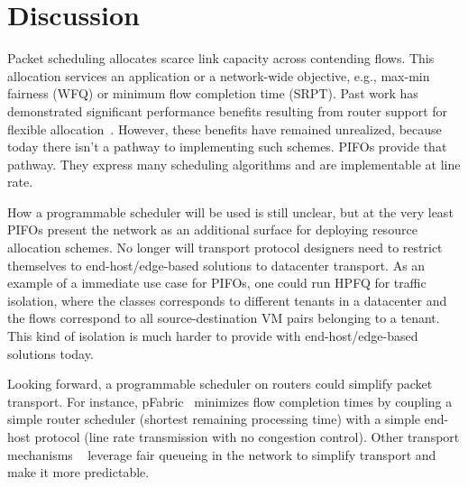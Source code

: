 \pagebreak
\section{Discussion}
\label{s:real_discussion}

Packet scheduling allocates scarce link capacity across contending flows.  This
allocation services an application or a network-wide objective, e.g., max-min
fairness (WFQ) or minimum flow completion time (SRPT).  Past work has
demonstrated significant performance benefits resulting from router support
for flexible allocation~\cite{pFabric, baraat, numfabric, nosilverbullet}.
However, these benefits have remained unrealized, because today
there isn't a pathway to implementing such schemes.
PIFOs provide that pathway. They express many scheduling
algorithms and are implementable at line rate.

How a programmable scheduler will be used is still unclear, but at the very
least PIFOs present the network as an additional surface for deploying
resource allocation schemes. No longer will transport protocol designers need
to restrict themselves to end-host/edge-based solutions to datacenter
transport.  As an example of a immediate use case for PIFOs, one could run HPFQ
for traffic isolation, where the classes corresponds to different tenants in a
datacenter and the flows correspond to all source-destination VM pairs
belonging to a tenant. This kind of isolation is much harder to provide with
end-host/edge-based solutions today.

Looking forward, a programmable scheduler on routers could
simplify packet transport. For instance, pFabric~\cite{pFabric}
minimizes flow completion times by coupling a simple router
scheduler (shortest remaining processing time) with a simple end-host protocol
(line rate transmission with no congestion control). Other transport mechanisms
~\cite{packetpair, numfabric} leverage fair queueing in the network to simplify
transport and make it more predictable.

